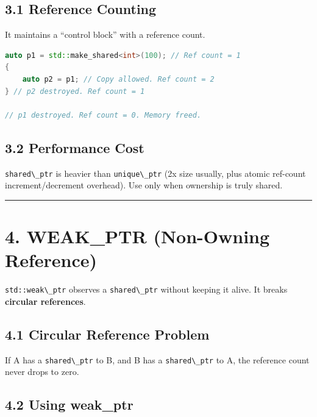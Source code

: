 \hypertarget{reference-counting}{%
\subsection{3.1 Reference Counting}\label{reference-counting}}

It maintains a ``control block'' with a reference count.

\begin{lstlisting}[language={C++}]
auto p1 = std::make_shared<int>(100); // Ref count = 1
{
    auto p2 = p1; // Copy allowed. Ref count = 2
} // p2 destroyed. Ref count = 1

// p1 destroyed. Ref count = 0. Memory freed.
\end{lstlisting}

\hypertarget{performance-cost}{%
\subsection{3.2 Performance Cost}\label{performance-cost}}

\passthrough{\lstinline!shared\_ptr!} is heavier than
\passthrough{\lstinline!unique\_ptr!} (2x size usually, plus atomic
ref-count increment/decrement overhead). Use only when ownership is
truly shared.

\begin{center}\rule{0.5\linewidth}{0.5pt}\end{center}

\hypertarget{weak_ptr-non-owning-reference}{%
\section{4. WEAK\_PTR (Non-Owning
Reference)}\label{weak_ptr-non-owning-reference}}

\passthrough{\lstinline!std::weak\_ptr!} observes a
\passthrough{\lstinline!shared\_ptr!} without keeping it alive. It
breaks \textbf{circular references}.

\hypertarget{circular-reference-problem}{%
\subsection{4.1 Circular Reference
Problem}\label{circular-reference-problem}}

If A has a \passthrough{\lstinline!shared\_ptr!} to B, and B has a
\passthrough{\lstinline!shared\_ptr!} to A, the reference count never
drops to zero.

\hypertarget{using-weak_ptr}{%
\subsection{4.2 Using weak\_ptr}\label{using-weak_ptr}}

